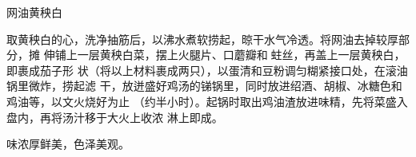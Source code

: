 \begin{recipe}{网油黄秧白}

\ingredients


\preparation

取黄秧白的心，洗净抽筋后，以沸水煮软捞起，晾干水气冷透。将网油去掉较厚部分，摊
伸铺上一层黄秧白菜，摆上火腿片、口蘑瓣和𧎼蛀丝，再盖上一层黄秧白，即裹成茄子形
状（将以上材料裹成两只），以蛋清和豆粉调匀糊紧接口处，在滚油锅里微炸，捞起滤
干，放迸盛好鸡汤的锑锅里，同时放进绍酒、胡椒、冰糖色和鸡油等，以文火烧好为止
（约半小时）。起锅时取出鸡油渣放进味精，先将菜盛入盘内，再将汤汁移于大火上收浓
淋上即成。

\features

味浓厚鲜美，色泽美观。

\end{recipe}

